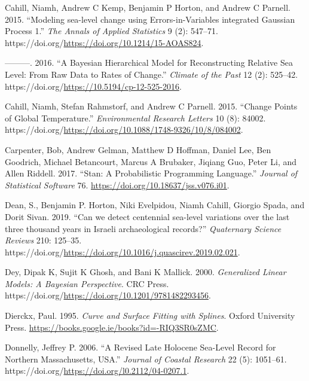\begin{CSLReferences}{1}{0}
\leavevmode{}%
Cahill, Niamh, Andrew C Kemp, Benjamin P Horton, and Andrew C Parnell. 2015. {``{Modeling sea-level change using {E}rrors-in-{V}ariables integrated {G}aussian {P}rocess 1}.''} \emph{The Annals of Applied Statistics} 9 (2): 547--71. https://doi.org/\url{https://doi.org/10.1214/15-AOAS824}.

\leavevmode{}%
---------. 2016. {``A {B}ayesian Hierarchical Model for Reconstructing Relative Sea Level: From Raw Data to Rates of Change.''} \emph{Climate of the Past} 12 (2): 525--42. https://doi.org/\url{https://10.5194/cp-12-525-2016}.

\leavevmode{}%
Cahill, Niamh, Stefan Rahmstorf, and Andrew C Parnell. 2015. {``Change Points of Global Temperature.''} \emph{Environmental Research Letters} 10 (8): 84002. https://doi.org/\url{https://doi.org/10.1088/1748-9326/10/8/084002}.

\leavevmode{}%
Carpenter, Bob, Andrew Gelman, Matthew D Hoffman, Daniel Lee, Ben Goodrich, Michael Betancourt, Marcus A Brubaker, Jiqiang Guo, Peter Li, and Allen Riddell. 2017. {``Stan: A Probabilistic Programming Language.''} \emph{Journal of Statistical Software} 76. \url{https://doi.org/10.18637/jss.v076.i01}.

\leavevmode{}%
Dean, S., Benjamin P. Horton, Niki Evelpidou, Niamh Cahill, Giorgio Spada, and Dorit Sivan. 2019. {``{Can we detect centennial sea-level variations over the last three thousand years in Israeli archaeological records?}''} \emph{Quaternary Science Reviews} 210: 125--35. https://doi.org/\url{https://doi.org/10.1016/j.quascirev.2019.02.021}.

\leavevmode{}%
Dey, Dipak K, Sujit K Ghosh, and Bani K Mallick. 2000. \emph{Generalized Linear Models: A {B}ayesian Perspective}. CRC Press. https://doi.org/\url{https://doi.org/10.1201/9781482293456}.

\leavevmode{}%
Dierckx, Paul. 1995. \emph{Curve and Surface Fitting with Splines}. Oxford University Press. \url{https://books.google.ie/books?id=-RIQ3SR0sZMC}.

\leavevmode{}%
Donnelly, Jeffrey P. 2006. {``{A Revised Late Holocene Sea-Level Record for Northern Massachusetts, USA}.''} \emph{Journal of Coastal Research} 22 (5): 1051--61. https://doi.org/\url{https://doi.org/l0.2112/04-0207.1}.


\end{CSLReferences}
